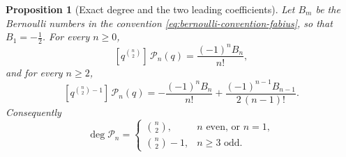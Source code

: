 \documentclass[11pt,a4paper,oneside,openany]{book}
\newtheorem{proposition}[proposition]{Proposition}
\theoremstyle{definition}
\theoremstyle{remark}
\begin{document}
\begin{proposition}[Exact degree and the two leading coefficients]\label{prop:qF-P-degree-sharp}
Let $B_m$ be the Bernoulli numbers in the convention
\eqref{eq:bernoulli-convention-fabius}, so that $B_1=-\tfrac12$.  For every
$n\ge0$,
\begin{equation}\label{eq:qF-P-leading}
 [q^{\binom n2}]\,\mathcal P_n(q)=\frac{(-1)^nB_n}{n!},
\end{equation}
and for every $n\ge2$,
\begin{equation}\label{eq:qF-P-subleading}
 [q^{\binom n2-1}]\,\mathcal P_n(q)
 =-\frac{(-1)^nB_n}{n!}+\frac{(-1)^{n-1}B_{n-1}}{2\,(n-1)!}.
\end{equation}
Consequently
\begin{equation}\label{eq:qF-P-exact-degree}
 \deg\mathcal P_n=
 \begin{cases}
  \binom n2, & n\text{ even, or }n=1,\\[2pt]
  \binom n2-1, & n\ge3\text{ odd.}
 \end{cases}
\end{equation}
\end{proposition}
\end{document}
